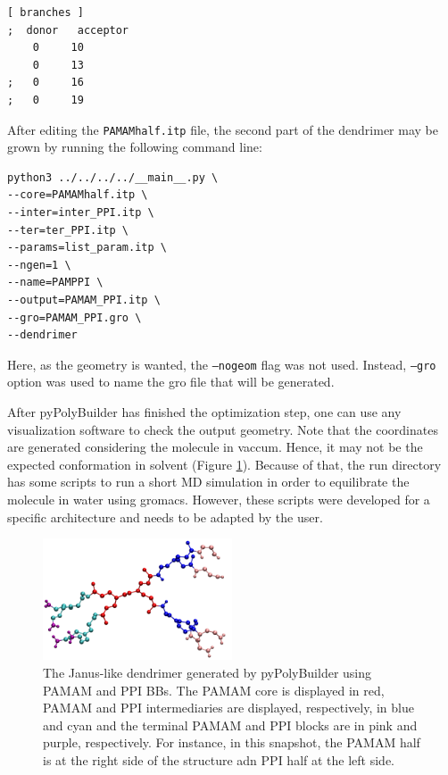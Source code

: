 \begin{lstlisting}
[ branches ]
;  donor   acceptor
    0     10
    0     13
;   0     16
;   0     19
\end{lstlisting}

After editing the \texttt{PAMAMhalf.itp} file, the second part of the dendrimer may be grown by running the following command line:

\begin{lstlisting}
python3 ../../../../__main__.py \
--core=PAMAMhalf.itp \
--inter=inter_PPI.itp \
--ter=ter_PPI.itp \
--params=list_param.itp \
--ngen=1 \
--name=PAMPPI \
--output=PAMAM_PPI.itp \
--gro=PAMAM_PPI.gro \
--dendrimer
\end{lstlisting}

Here, as the geometry is wanted, the \texttt{--nogeom} flag was not used.
Instead, \texttt{--gro} option was used to name the gro file that will be generated.

After pyPolyBuilder has finished the optimization step, one can use any visualization software to check the output geometry. 
Note that the coordinates are generated considering the molecule in vaccum.
Hence, it may not be the expected conformation in solvent (Figure \ref{fig:JanusPPB}).
Because of that, the run directory has some scripts to run a short MD simulation in order to equilibrate the molecule in water using gromacs.
However, these scripts were developed for a specific architecture and needs to be adapted by the user.

\begin{figure}
    \centering
    \includegraphics[width=0.5\textwidth]{PAMAM_PPI-Janus/PAMAM_PPI.pdf}
    \caption{The Janus-like dendrimer generated by pyPolyBuilder using PAMAM and PPI BBs. The PAMAM core is displayed in red, PAMAM and PPI intermediaries are displayed, respectively, in blue and cyan and the terminal PAMAM and PPI blocks are in pink and purple, respectively.
    For instance, in this snapshot, the PAMAM half is at the right side of the structure adn PPI half at the left side.}
    \label{fig:JanusPPB}
\end{figure}

